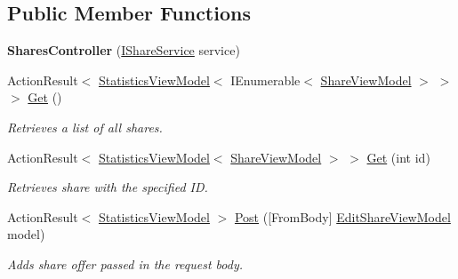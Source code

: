 \subsection*{Public Member Functions}
\begin{DoxyCompactItemize}
\item 
\mbox{\label{class_gielda_l2_1_1_a_p_i_1_1_controllers_1_1_shares_controller_a4b149c15d02a0cc6c01c8eb62180b43d}} 
{\bfseries Shares\+Controller} (\mbox{\hyperlink{interface_gielda_l2_1_1_i_n_f_r_a_s_t_r_u_c_t_u_r_e_1_1_interfaces_1_1_i_share_service}{I\+Share\+Service}} service)
\item 
Action\+Result$<$ \mbox{\hyperlink{class_gielda_l2_1_1_a_p_i_1_1_view_models_1_1_view_1_1_statistics_view_model}{Statistics\+View\+Model}}$<$ I\+Enumerable$<$ \mbox{\hyperlink{class_gielda_l2_1_1_a_p_i_1_1_view_models_1_1_view_1_1_share_view_model}{Share\+View\+Model}} $>$ $>$ $>$ \mbox{\hyperlink{class_gielda_l2_1_1_a_p_i_1_1_controllers_1_1_shares_controller_a7a4e1916ed4b83d7cacfb17d0e1e56de}{Get}} ()
\begin{DoxyCompactList}\small\item\em Retrieves a list of all shares. \end{DoxyCompactList}\item 
Action\+Result$<$ \mbox{\hyperlink{class_gielda_l2_1_1_a_p_i_1_1_view_models_1_1_view_1_1_statistics_view_model}{Statistics\+View\+Model}}$<$ \mbox{\hyperlink{class_gielda_l2_1_1_a_p_i_1_1_view_models_1_1_view_1_1_share_view_model}{Share\+View\+Model}} $>$ $>$ \mbox{\hyperlink{class_gielda_l2_1_1_a_p_i_1_1_controllers_1_1_shares_controller_acb86566291d689294a362a56accaa2a0}{Get}} (int id)
\begin{DoxyCompactList}\small\item\em Retrieves share with the specified ID. \end{DoxyCompactList}\item 
Action\+Result$<$ \mbox{\hyperlink{class_gielda_l2_1_1_a_p_i_1_1_view_models_1_1_view_1_1_statistics_view_model}{Statistics\+View\+Model}} $>$ \mbox{\hyperlink{class_gielda_l2_1_1_a_p_i_1_1_controllers_1_1_shares_controller_a7b313a2208fd8c9f5c942ccdb874ac49}{Post}} (\mbox{[}From\+Body\mbox{]} \mbox{\hyperlink{class_gielda_l2_1_1_a_p_i_1_1_view_models_1_1_edit_1_1_edit_share_view_model}{Edit\+Share\+View\+Model}} model)
\begin{DoxyCompactList}\small\item\em Adds share offer passed in the request body. \end{DoxyCompactList}\item 

\end{DoxyCompactItemize}
